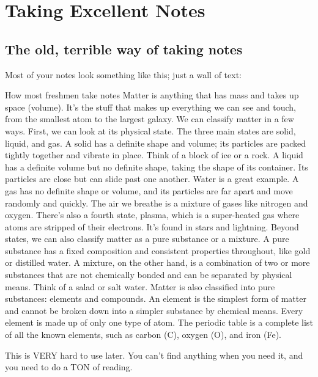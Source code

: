 \documentclass[../main.tex]{subfiles}
\begin{document}
\chapter{Taking Excellent Notes}

\section{The old, terrible way of taking notes}

Most of your notes look something like this; just a wall of text:\\

\begin{boxred}{How most freshmen take notes}
Matter is anything that has mass and takes up space (volume). It's the stuff that makes up everything we can see and touch, from the smallest atom to the largest galaxy. We can classify matter in a few ways. First, we can look at its physical state. The three main states are solid, liquid, and gas. A solid has a definite shape and volume; its particles are packed tightly together and vibrate in place. Think of a block of ice or a rock. A liquid has a definite volume but no definite shape, taking the shape of its container. Its particles are close but can slide past one another. Water is a great example. A gas has no definite shape or volume, and its particles are far apart and move randomly and quickly. The air we breathe is a mixture of gases like nitrogen and oxygen. There's also a fourth state, plasma, which is a super-heated gas where atoms are stripped of their electrons. It's found in stars and lightning. Beyond states, we can also classify matter as a pure substance or a mixture. A pure substance has a fixed composition and consistent properties throughout, like gold or distilled water. A mixture, on the other hand, is a combination of two or more substances that are not chemically bonded and can be separated by physical means. Think of a salad or salt water.  Matter is also classified into pure substances: elements and compounds. An element is the simplest form of matter and cannot be broken down into a simpler substance by chemical means. Every element is made up of only one type of atom. The periodic table is a complete list of all the known elements, such as carbon (C), oxygen (O), and iron (Fe).
\end{boxred}

This is VERY hard to use later.  You can't find anything when you need it, and you need to do a TON of reading.\\
\end{document}
